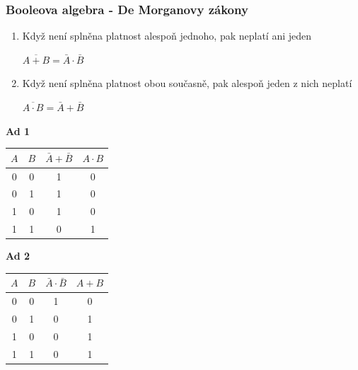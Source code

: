 	\begin{frame}
    \frametitle{Booleova algebra - De Morganovy zákony}
		\boldmath
		
		
		\begin{enumerate}
			\item Když není splněna platnost alespoň jednoho, pak neplatí ani jeden
			\begin{center}
				$\overline{A + B} = \bar{A}\cdot \bar{B}$
			\end{center}
			
			
			\item Když není splněna platnost obou současně, pak alespoň jeden z nich neplatí
			\begin{center}
				$\overline{A \cdot B} = \bar{A}+ \bar{B}$
			\end{center}
		\end{enumerate}
		
		\vspace{5mm}
		\begin{minipage}[t][0.4\textheight][t]{0.45\textwidth}
      \textbf{Ad 1}
			
				\begin{tabular}{ c c | c c }
					$A$ & $B$ & $\bar{A} + \bar{B}$ & $A \cdot B$\\
					\hline
					0 & 0 & 1 & 0 \\
					0 & 1 & 1 & 0 \\
					1 & 0 & 1 & 0 \\
					1 & 1 & 0 & 1 \\
				\end{tabular}
      
		\end{minipage}
		\begin{minipage}[t][0.4\textheight][t]{0.45\textwidth}
      \textbf{Ad 2}
			
				\begin{tabular}{ c c | c c }
					$A$ & $B$ & $\bar{A} \cdot \bar{B}$ & $A + B$\\
					\hline
					0 & 0 & 1 & 0 \\
					0 & 1 & 0 & 1 \\
					1 & 0 & 0 & 1 \\
					1 & 1 & 0 & 1 \\
				\end{tabular}
      
		\end{minipage}

	\end{frame}

